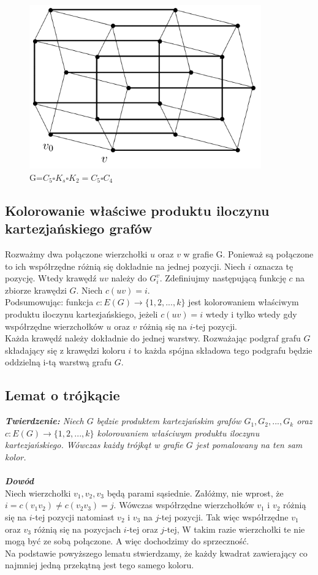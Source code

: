 \documentclass[12pt,a4paper,titlepage]{article}
\begin{document}
\begin{figure}
\centering
\includegraphics[width = 10cm]{rys1.png}
\caption{G=$C_5 \square K_s \square K_2 = C_5 \square C_4$}
\end{figure}

\newpage
\subsection{Kolorowanie właściwe produktu iloczynu kartezjańskiego grafów}
Rozważmy dwa połączone wierzchołki $u$ oraz $v$ w grafie G. Ponieważ są połączone to ich współrzędne różnią się dokładnie na jednej pozycji. Niech $i$ oznacza tę pozycję. Wtedy krawędź $uv$ należy do $G_i^v$. Zdefiniujmy następującą funkcję $c$ na zbiorze krawędzi $G$. Niech $c(uv) = i$.\\
Podsumowując: funkcja $c: E(G) \rightarrow \{1,2,...,k\}$ jest kolorowaniem właściwym produktu iloczynu kartezjańskiego, jeżeli $c(uv) = i $ wtedy i tylko wtedy gdy współrzędne wierzchołków $u$ oraz $v$ różnią się na $i$-tej pozycji.\\
Każda krawędź należy dokładnie do jednej warstwy. Rozważając podgraf grafu $G$ składający się z krawędzi koloru $i$ to każda spójna składowa tego podgrafu będzie oddzielną i-tą warstwą grafu $G$.
\subsection{Lemat o trójkącie}
\textit{\textbf{Twierdzenie:} Niech $G$ będzie produktem kartezjańskim grafów $G_1, G_2, ... , G_k$ oraz $c: E(G) \rightarrow \{1,2,...,k\}$ kolorowaniem właściwym produktu iloczynu kartezjańskiego. Wówczas każdy trójkąt w grafie $G$ jest pomalowany na ten sam kolor.}\\
\\
\textit{\textbf{Dowód}}\\
Niech wierzchołki $v_1, v_2, v_3$ będą parami sąsiednie. Załóżmy, nie wprost, że $i=c(v_1 v_2 ) \neq c(v_2 v_3)=j$. Wówczas współrzędne wierzchołków $v_1$ i $v_2$ różnią się na $i$-tej pozycji natomiast $v_2$ i $v_3$ na $j$-tej pozycji. Tak więc współrzędne $v_1$ oraz $v_3$ różnią się na pozycjach $i$-tej oraz $j$-tej, W takim razie wierzchołki te nie mogą być ze sobą połączone. A więc dochodzimy do sprzeczność.\\
Na podstawie powyższego lematu stwierdzamy, że każdy kwadrat zawierający co najmniej jedną przekątną jest tego samego koloru.\\
\end{document}
